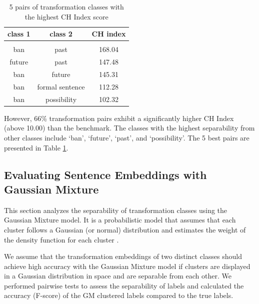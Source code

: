 \documentclass[11pt]{article}
\begin{document}
\begin{table}[!htp]
\centering
\begin{tabular}{c c c}
\toprule
\vspace{0.1cm}
\textbf{class 1} &\textbf{class 2} & \textbf{CH index} \vspace{0.15cm}\\ 
 \hline \\[-1.7ex]
\vspace{0.1cm} ban	&	past	&	168.04 \\
\vspace{0.1cm} future	& past	&   147.48\\
\vspace{0.1cm} ban	& future	&	145.31 \\
\vspace{0.1cm} ban	& formal sentence	&112.28\\
\vspace{0.1cm} ban	& possibility	&102.32 \\

\toprule
\end{tabular}
\caption{5 pairs of transformation classes with the highest CH Index score}
\label{CH_best}
\end{table}

However, 66\% transformation pairs exhibit a significantly higher CH Index (above 10.00) than the benchmark. The classes with the highest separability from other classes include `ban', `future', `past', and `possibility'. The 5 best pairs are presented in Table \ref{CH_best}.

\subsection{Evaluating Sentence Embeddings with Gaussian Mixture}


This section analyzes the separability of transformation classes using the Gaussian Mixture model. It is a probabilistic model that assumes that each cluster follows a Gaussian (or normal) distribution and estimates the weight of
the density function for each cluster \cite{reynolds2009gaussian,5298967}. 

We assume that the transformation embeddings of two distinct classes should achieve high
accuracy with the Gaussian Mixture model if clusters are displayed in a Gaussian distribution
in space and are separable from each other.
We performed pairwise tests to assess the separability of labels and calculated the accuracy (F-score) of the GM clustered labels compared to the true labels.
\end{document}
